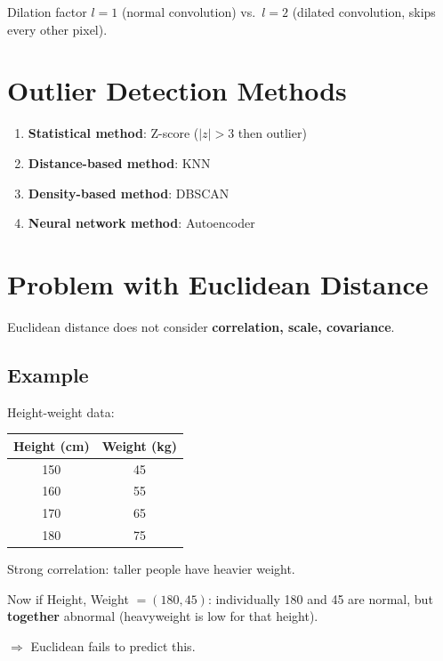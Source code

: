 \documentclass[12pt,a4paper]{article}
\begin{document}
Dilation factor $l=1$ (normal convolution) vs.\ $l=2$ (dilated convolution, skips every other pixel).

\section{Outlier Detection Methods}

\begin{enumerate}
  \item \textbf{Statistical method}: Z-score ($|z| > 3$ then outlier)
  \item \textbf{Distance-based method}: KNN
  \item \textbf{Density-based method}: DBSCAN
  \item \textbf{Neural network method}: Autoencoder
\end{enumerate}

\section{Problem with Euclidean Distance}

\begin{notebox}
Euclidean distance does not consider \textbf{correlation, scale, covariance}.
\end{notebox}

\subsection{Example}

\begin{examplebox}
Height-weight data:
\begin{center}
\begin{tabular}{cc}
\toprule
Height (cm) & Weight (kg) \\
\midrule
150 & 45 \\
160 & 55 \\
170 & 65 \\
180 & 75 \\
\bottomrule
\end{tabular}
\end{center}

Strong correlation: taller people have heavier weight.

Now if Height, Weight $= (180, 45)$: individually 180 and 45 are normal, but \textbf{together} abnormal (heavyweight is low for that height).

$\Rightarrow$ Euclidean fails to predict this.
\end{examplebox}
\end{document}
